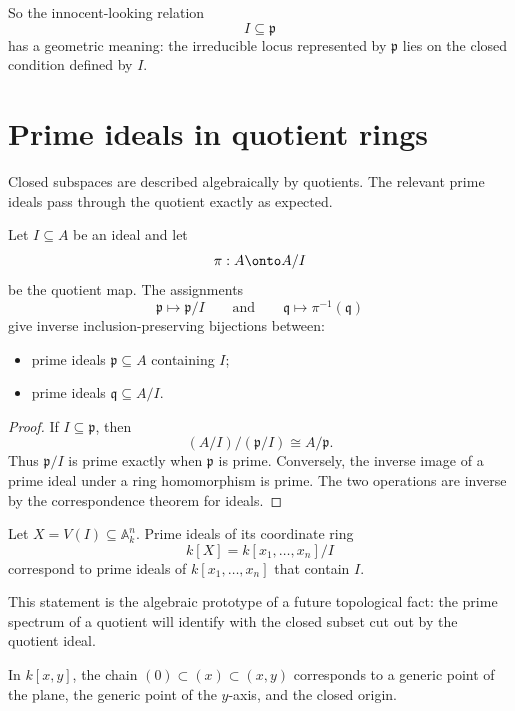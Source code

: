 So the innocent-looking relation
\[
I\subseteq\mathfrak p
\]
has a geometric meaning: the irreducible locus represented by \(\mathfrak p\) lies on the
closed condition defined by \(I\).

\section{Prime ideals in quotient rings}

Closed subspaces are described algebraically by quotients.  The relevant prime ideals pass
through the quotient exactly as expected.

\begin{theorem}
\label{thm:vi06-prime-correspondence}
Let \(I\subseteq A\) be an ideal and let
\[
\pi:A\onto A/I
\]
be the quotient map.  The assignments
\[
\mathfrak p\longmapsto \mathfrak p/I
\qquad\text{and}\qquad
\mathfrak q\longmapsto \pi^{-1}(\mathfrak q)
\]
give inverse inclusion-preserving bijections between:
\begin{itemize}
  \item prime ideals \(\mathfrak p\subseteq A\) containing \(I\);
  \item prime ideals \(\mathfrak q\subseteq A/I\).
\end{itemize}
\end{theorem}

\begin{proof}
If \(I\subseteq\mathfrak p\), then
\[
(A/I)/(\mathfrak p/I)\cong A/\mathfrak p.
\]
Thus \(\mathfrak p/I\) is prime exactly when \(\mathfrak p\) is prime.  Conversely,
the inverse image of a prime ideal under a ring homomorphism is prime.  The two operations
are inverse by the correspondence theorem for ideals.
\end{proof}

\begin{corollary}
Let \(X=V(I)\subseteq\mathbb A_k^n\).  Prime ideals of its coordinate ring
\[
k[X]=k[x_1,\dots,x_n]/I
\]
correspond to prime ideals of \(k[x_1,\dots,x_n]\) that contain \(I\).
\end{corollary}

This statement is the algebraic prototype of a future topological fact: the prime spectrum
of a quotient will identify with the closed subset cut out by the quotient ideal.

\begin{example}\label{ex:vi06-expand-02}
In $k[x,y]$, the chain $(0)\subset(x)\subset(x,y)$ corresponds to a generic point of the plane, the generic point of the $y$-axis, and the closed origin.
\end{example}
